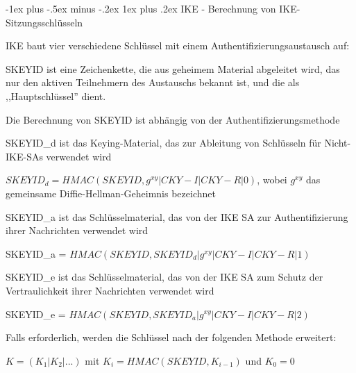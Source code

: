 \documentclass[a4paper]{article}
\makeatletter
\renewcommand{\subsubsection}{\@startsection{subsubsection}{3}{0mm}%
 {-1ex plus -.5ex minus -.2ex}%
 {1ex plus .2ex}%
 {\normalfont\small\bfseries}}
\makeatother
\begin{document}
\begin{multicols}{3}
      \subsubsection{IKE - Berechnung von IKE-Sitzungsschlüsseln}
      \begin{itemize*}
            \item IKE baut vier verschiedene Schlüssel mit einem Authentifizierungsaustausch auf:
            \begin{itemize*}
                  \item SKEYID ist eine Zeichenkette, die aus geheimem Material abgeleitet wird, das nur den aktiven Teilnehmern des Austauschs bekannt ist, und die als ,,Hauptschlüssel'' dient.
                  \begin{itemize*}
                        \item Die Berechnung von SKEYID ist abhängig von der Authentifizierungsmethode
                  \end{itemize*}
                  \item SKEYID\_d ist das Keying-Material, das zur Ableitung von Schlüsseln für Nicht-IKE-SAs verwendet wird
                  \begin{itemize*}
                        \item $SKEYID_d = HMAC(SKEYID, g^{xy} | CKY-I | CKY-R | 0)$, wobei $g^{xy}$ das gemeinsame Diffie-Hellman-Geheimnis bezeichnet
                  \end{itemize*}
                  \item SKEYID\_a ist das Schlüsselmaterial, das von der IKE SA zur Authentifizierung ihrer Nachrichten verwendet wird
                  \begin{itemize*}
                        \item SKEYID\_a = $HMAC(SKEYID, SKEYID_d | g^{xy} | CKY-I | CKY-R | 1)$
                  \end{itemize*}
                  \item SKEYID\_e ist das Schlüsselmaterial, das von der IKE SA zum Schutz der Vertraulichkeit ihrer Nachrichten verwendet wird
                  \begin{itemize*}
                        \item SKEYID\_e = $HMAC(SKEYID, SKEYID_a | g^{xy} | CKY-I | CKY-R | 2)$
                  \end{itemize*}
            \end{itemize*}
            \item Falls erforderlich, werden die Schlüssel nach der folgenden Methode erweitert:
            \begin{itemize*}
                  \item $K=(K_1 | K_2 | ...)$ mit $K_i = HMAC(SKEYID, K_{i-1})$ und $K_0 = 0$
            \end{itemize*}
      \end{itemize*}


\end{multicols}
\end{document}
